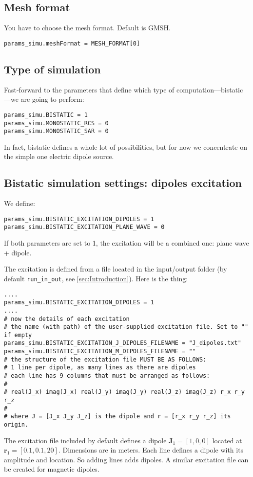 \documentclass[a4paper,10pt]{book}
\begin{document}
\subsection{Mesh format}
%
\par
You have to choose the mesh format. Default is GMSH.
\begin{verbatim}
params_simu.meshFormat = MESH_FORMAT[0]
\end{verbatim}

\subsection{Type of simulation}
%
\par
Fast-forward to the parameters that define which type of computation---bistatic---we are going to perform:
\begin{verbatim}
params_simu.BISTATIC = 1
params_simu.MONOSTATIC_RCS = 0
params_simu.MONOSTATIC_SAR = 0
\end{verbatim}
In fact, bistatic defines a whole lot of possibilities, but for now we concentrate on the simple one electric dipole source.

\subsection{Bistatic simulation settings: dipoles excitation}
\label{subsec:dipole_excitation}
%
\par
We define:
\begin{verbatim}
params_simu.BISTATIC_EXCITATION_DIPOLES = 1
params_simu.BISTATIC_EXCITATION_PLANE_WAVE = 0
\end{verbatim}
If both parameters are set to 1, the excitation will be a combined one: plane wave + dipole.
%
\par
The excitation is defined from a file located in the input/output folder (by default \texttt{run\_in\_out}, see \ref{sec:Introduction}). Here is the thing:
\begin{verbatim}
....
params_simu.BISTATIC_EXCITATION_DIPOLES = 1
....
# now the details of each excitation
# the name (with path) of the user-supplied excitation file. Set to "" if empty
params_simu.BISTATIC_EXCITATION_J_DIPOLES_FILENAME = "J_dipoles.txt"
params_simu.BISTATIC_EXCITATION_M_DIPOLES_FILENAME = ""
# the structure of the excitation file MUST BE AS FOLLOWS:
# 1 line per dipole, as many lines as there are dipoles
# each line has 9 columns that must be arranged as follows:
#
# real(J_x) imag(J_x) real(J_y) imag(J_y) real(J_z) imag(J_z) r_x r_y r_z
#
# where J = [J_x J_y J_z] is the dipole and r = [r_x r_y r_z] its origin.
\end{verbatim}
The excitation file included by default defines a dipole $\mathbf{J}_1 = [1, 0, 0]$ located at $\mathbf{r}_1 = [0.1, 0.1, 20]$. Dimensions are in meters. Each line defines a dipole with its amplitude and location. So adding lines adds dipoles. A similar excitation file can be created for magnetic dipoles.
\end{document}
